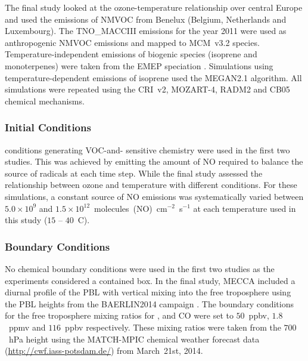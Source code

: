 The final study looked at the ozone-temperature relationship over central Europe and used the emissions of NMVOC from Benelux (Belgium, Netherlands and Luxembourg).
The TNO\_MACCIII emissions for the year 2011 were used as anthropogenic NMVOC emissions and mapped to MCM~v3.2 species.
Temperature-independent emissions of biogenic species (isoprene and monoterpenes) were taken from the EMEP speciation \citep{Simpson:2012}.
Simulations using temperature-dependent emissions of isoprene used the MEGAN2.1 \citep{Guenther:2012} algorithm.
All simulations were repeated using the CRI~v2, MOZART-4, RADM2 and CB05 chemical mechanisms.

\subsubsection{ Initial Conditions} 
 conditions generating VOC-and- sensitive chemistry were used in the first two studies.
This was achieved by emitting the amount of NO required to balance the source of radicals at each time step.
While the final study assessed the relationship between ozone and temperature with different  conditions.
For these simulations, a constant source of NO emissions was systematically varied between $5.0 \times 10^9$ and $1.5 \times 10^{12}$~molecules~(NO)~cm$^{-2}$~s$^{-1}$ at each temperature used in this study ($15$ -- $40$~\degree C).

\subsubsection{Boundary Conditions} 
No chemical boundary conditions were used in the first two studies as the experiments considered a contained box.
In the final study, MECCA included a diurnal profile of the PBL with vertical mixing into the free troposphere using the PBL heights from the BAERLIN2014 campaign \citep{Bonn:2016}.
The boundary conditions for the free troposphere mixing ratios for ,  and CO were set to $50$~ppbv, $1.8$~ppmv and $116$~ppbv respectively. 
These mixing ratios were taken from the $700$~hPa height using the MATCH-MPIC chemical weather forecast data (\url{http://cwf.iass-potsdam.de/}) from March~21st, 2014.
